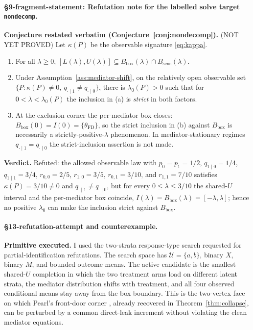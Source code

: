\paragraph{\S9-fragment-statement: Refutation note for the labelled solve target \texttt{nondecomp}.}\label{prop:nondecomp-refuted}
\textbf{Conjecture restated verbatim (Conjecture~\ref{conj:nondecomp}).}
\textnormal{(NOT YET PROVED)} Let $\kappa(P)$ be the observable signature \eqref{eq:kappa}.
\begin{enumerate}[label=(\alph*),leftmargin=2em,itemsep=1pt]
  \item For all $\lambda\ge0$, $[L(\lambda),U(\lambda)]\subseteq B_{\mathrm{box}}(\lambda)\cap B_{\mathrm{sens}}(\lambda)$.
  \item Under Assumption~\ref{ass:mediator-shift}, on the relatively open observable set
        $\{P:\kappa(P)\neq0,\ q_{\cdot\mid1}\neq q_{\cdot\mid0}\}$, there is $\lambda_0(P)>0$ such that
        for $0<\lambda<\lambda_0(P)$ the inclusion in (a) is \emph{strict} in both factors.
  \item At the exclusion corner the per-mediator box closes:
        $B_{\mathrm{box}}(0)=I(0)=\{\theta_{\mathrm{FD}}\}$, so the strict inclusion in (b) against
        $B_{\mathrm{box}}$ is necessarily a strictly-positive-$\lambda$ phenomenon. In mediator-stationary
        regimes $q_{\cdot\mid1}=q_{\cdot\mid0}$ the strict-inclusion assertion is not made.
\end{enumerate}

\textbf{Verdict.} Refuted: the allowed observable law with \(p_0=p_1=1/2\), \(q_{1\mid0}=1/4\), \(q_{1\mid1}=3/4\), \(r_{0,0}=2/5\), \(r_{1,0}=3/5\), \(r_{0,1}=3/10\), and \(r_{1,1}=7/10\) satisfies \(\kappa(P)=3/10\neq0\) and \(q_{\cdot\mid1}\neq q_{\cdot\mid0}\), but for every \(0\le\lambda\le3/10\) the shared-\(U\) interval and the per-mediator box coincide, \(I(\lambda)=B_{\mathrm{box}}(\lambda)=[-\lambda,\lambda]\); hence no positive \(\lambda_0\) can make the inclusion strict against \(B_{\mathrm{box}}\).

\paragraph{\S13-refutation-attempt and counterexample.}
\textbf{Primitive executed.} I used the two-strata response-type search requested for
partial-identification refutations. The search space has
\(\mathcal U=\{a,b\}\), binary \(X\), binary \(M\), and bounded outcome means.
The active candidate is the smallest shared-\(U\) completion in which the two
treatment arms load on different latent strata, the mediator distribution shifts
with treatment, and all four observed conditional means stay away from the box
boundary. This is the two-vertex face on which Pearl's front-door corner
\cite{Pearl1995CausalDiagrams}, already recovered in Theorem~\ref{thm:collapse},
can be perturbed by a common direct-leak increment without violating the clean
mediator equations.

